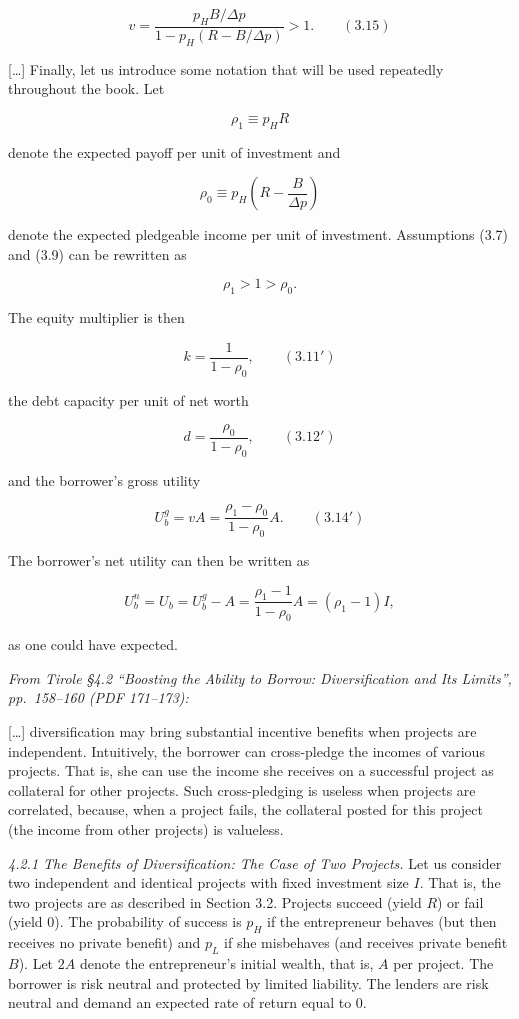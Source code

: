 \documentclass[11pt,a4paper]{article}
\begin{document}
\[v = \frac{p_H B/\Delta p}{1 - p_H(R - B/\Delta p)} > 1. \qquad (3.15)\]

{[}\ldots{]} Finally, let us introduce some notation that will be used repeatedly throughout the
book. Let

\[\rho_1 \equiv p_H R\]

denote the expected payoff per unit of investment and

\[\rho_0 \equiv p_H\left(R - \frac{B}{\Delta p}\right)\]

denote the expected pledgeable income per unit of investment. Assumptions (3.7) and (3.9) can be
rewritten as

\[\rho_1 > 1 > \rho_0.\]

The equity multiplier is then

\[k = \frac{1}{1 - \rho_0}, \qquad (3.11')\]

the debt capacity per unit of net worth

\[d = \frac{\rho_0}{1 - \rho_0}, \qquad (3.12')\]

and the borrower's gross utility

\[U_b^g = vA = \frac{\rho_1 - \rho_0}{1 - \rho_0} A. \qquad (3.14')\]

The borrower's net utility can then be written as

\[U_b^n = U_b = U_b^g - A = \frac{\rho_1 - 1}{1 - \rho_0} A = (\rho_1 - 1) I,\]

as one could have expected.

\emph{From Tirole §4.2 ``Boosting the Ability to Borrow: Diversification and Its Limits'',
pp.~158--160 (PDF 171--173):}

{[}\ldots{]} diversification may bring substantial incentive benefits when projects are independent.
Intuitively, the borrower can cross-pledge the incomes of various projects. That is, she can use the
income she receives on a successful project as collateral for other projects. Such cross-pledging is
useless when projects are correlated, because, when a project fails, the collateral posted for this
project (the income from other projects) is valueless.

\emph{4.2.1 The Benefits of Diversification: The Case of Two Projects.} Let us consider two
independent and identical projects with fixed investment size \(I\). That is, the two projects are
as described in Section 3.2. Projects succeed (yield \(R\)) or fail (yield 0). The probability of
success is \(p_H\) if the entrepreneur behaves (but then receives no private benefit) and \(p_L\) if
she misbehaves (and receives private benefit \(B\)). Let \(2A\) denote the entrepreneur's initial
wealth, that is, \(A\) per project. The borrower is risk neutral and protected by limited liability.
The lenders are risk neutral and demand an expected rate of return equal to 0.
\end{document}
